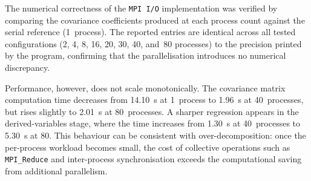 The numerical correctness of the \texttt{MPI~I/O} implementation was verified by
comparing the covariance coefficients produced at each process count against the
serial reference (1~process). The reported entries are identical across all tested
configurations (2, 4, 8, 16, 20, 30, 40, and~80 processes) to the precision
printed by the program, confirming that the parallelisation introduces no
numerical discrepancy.

Performance, however, does not scale monotonically. The covariance matrix
computation time decreases from 14.10~s at 1~process to 1.96~s at
40~processes, but rises slightly to 2.01~s at 80~processes. A sharper
regression appears in the derived-variables stage, where the time increases from
1.30~s at 40~processes to 5.30~s at 80. This behaviour can be consistent
with over-decomposition: once the per-process workload becomes small, the cost of
collective operations such as \texttt{MPI\_Reduce} and inter-process
synchronisation exceeds the computational saving from additional parallelism.